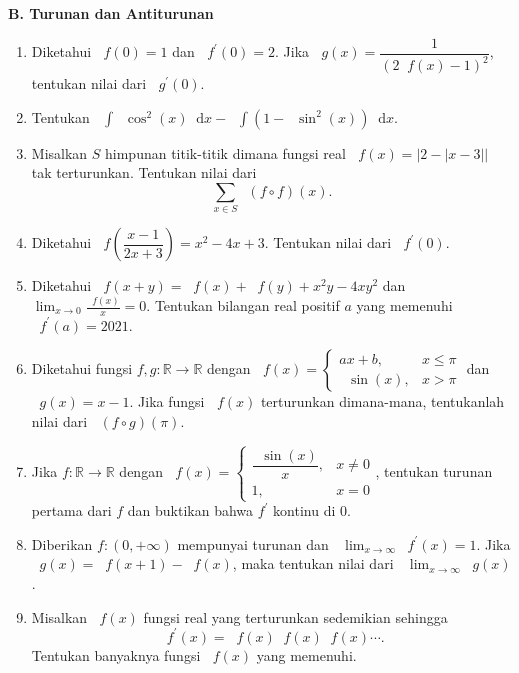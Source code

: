 \documentclass[12pt]{article}
\newcommand*\diff{\mathop{}\!\mathrm{d}}
\newcommand*\func[2]{\mathop{}\!{#1}{\left({#2}\right)}}
\newcommand*\ds[1]{\mathop{}\!\displaystyle{{#1}}}
\begin{document}
	\noindent \textbf{B. Turunan dan Antiturunan}
	\begin{enumerate}[leftmargin=*]
		\item Diketahui $ \func{f}{0} = 1 $ dan $ \func{f^{\prime}}{0} = 2 $. Jika $ \func{g}{x} = \dfrac{1}{\left(2\func{f}{x} - 1\right)^{2}} $, tentukan nilai dari $ \func{g^{\prime}}{0} $.
		\item Tentukan $ \ds{\int{\func{\cos^{2}}{x} \diff{x}}} - \ds{\int{\left(1 - \func{\sin^{2}}{x}\right) \diff{x}}} $.
		\item Misalkan $ S $ himpunan titik-titik dimana fungsi real $ \func{f}{x} = \left|2 - \left|x - 3\right|\right| $ tak terturunkan. Tentukan nilai dari
		\[ \sum_{x \in S}{\func{\left(f \circ f\right)}{x}}. \]
		\item Diketahui $ \func{f}{\dfrac{x - 1}{2x + 3}} = x^{2} - 4x + 3 $. Tentukan nilai dari $ \func{f^{\prime}}{0} $.
		\item Diketahui $ \func{f}{x + y} = \func{f}{x} + \func{f}{y} + x^{2}y - 4xy^{2} $ dan $ \displaystyle{\lim_{x \to 0}{\frac{\func{f}{x}}{x}} = 0} $. Tentukan bilangan real positif $ a $ yang memenuhi $ \func{f^{\prime}}{a} = 2021 $.
		\item Diketahui fungsi $ f, g : \mathbb{R} \to \mathbb{R} $ dengan $ \func{f}{x} = \begin{cases}
			ax + b, & x \leq \pi \\
			\func{\sin}{x}, & x > \pi
		\end{cases} $ dan $ \func{g}{x} = x - 1 $. Jika fungsi $ \func{f}{x} $ terturunkan dimana-mana, tentukanlah nilai dari $ \func{\left(f \circ g\right)}{\pi} $.
		\item Jika $ f : \mathbb{R} \to \mathbb{R} $ dengan $ \func{f}{x} = \begin{cases}
			\dfrac{\func{\sin}{x}}{x}, & x \ne 0 \\[2pt]
			1, & x = 0
		\end{cases} $, tentukan turunan pertama dari $ f $ dan buktikan bahwa $ f^{\prime} $ kontinu di 0.
		\item Diberikan $ f : \left(0, +\infty\right) $ mempunyai turunan dan $ \ds{\lim_{x \to \infty}{\func{f^{\prime}}{x}}} = 1 $. Jika $ \func{g}{x} = \func{f}{x + 1} - \func{f}{x} $, maka tentukan nilai dari $ \ds{\lim_{x \to \infty}{\func{g}{x}}} $.
		\item Misalkan $ \func{f}{x} $ fungsi real yang terturunkan sedemikian sehingga
		\[ \func{f^{\prime}}{x} = \func{f}{x}\func{f}{x}\func{f}{x}\cdots. \]
		Tentukan banyaknya fungsi $ \func{f}{x} $ yang memenuhi.

\end{enumerate}
\end{document}
